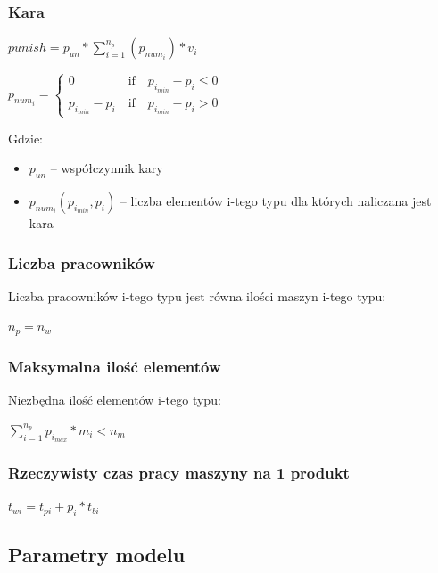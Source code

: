 \documentclass[a4paper]{article}
\begin{document}
\subsubsection{Kara}
$punish = p_{un}*\sum^{n_p}_{i=1}(p_{num_i})*v_i$

$p_{num_i}= \left\{\begin{matrix} 0  \;\quad\quad\quad\quad  \textrm{if} \quad  p_{i_{min}}-p_i \leq  0    \\ p_{i_{min}}-p_i  \quad  \textrm{if} \quad  p_{i_{min}}-p_i >  0  \end{matrix}\right.$

Gdzie: 
\begin{itemize}
    \item $p_{un}$ -- współczynnik kary
    \item $p_{num_i}(p_{i_{min}}, p_i)$ -- liczba elementów i-tego typu dla których naliczana jest kara
\end{itemize}
\subsubsection{Liczba pracowników}

Liczba pracowników i-tego typu jest równa ilości maszyn i-tego typu:

$n_p = n_w$

\subsubsection{Maksymalna ilość elementów}\label{max-number-of-items}

Niezbędna ilość elementów i-tego typu:

$\sum^{n_p}_{i=1} p_{i_{max}} * m_i< n_m$

\subsubsection{Rzeczywisty czas pracy maszyny na 1 produkt}\label{real-working-time-of-the-i-type-machineemployee-for-one-product} 
$t_{wi} = t_{pi} + p_i * t_{bi}$

\subsection{Parametry modelu}\label{model-assumption}
\end{document}
